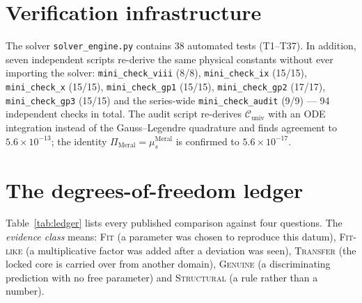 \documentclass[12pt,a4paper]{article}
\begin{document}
\section{Verification infrastructure}
The solver \texttt{solver\_engine.py} contains 38 automated tests
(T1--T37). In addition, seven independent scripts re-derive the same
physical constants without ever importing the solver:
\texttt{mini\_check\_viii} (8/8), \texttt{mini\_check\_ix} (15/15),
\texttt{mini\_check\_x} (15/15), \texttt{mini\_check\_gp1} (15/15),
\texttt{mini\_check\_gp2} (17/17), \texttt{mini\_check\_gp3} (15/15) and the
series-wide \texttt{mini\_check\_audit} (9/9) --- 94 independent checks in
total. The audit script re-derives $\mathcal{C}_{\mathrm{univ}}$ with an
ODE integration instead of the Gauss--Legendre quadrature and finds
agreement to $5.6\times10^{-13}$; the identity
$\Pi_{\mathrm{Meral}} = \mu_s^{\mathrm{Meral}}$ is confirmed to
$5.6\times10^{-17}$.

\section{The degrees-of-freedom ledger}
Table~\ref{tab:ledger} lists every published comparison against four
questions. The \emph{evidence class} means: \textsc{Fit} (a parameter was
chosen to reproduce this datum), \textsc{Fit-like} (a multiplicative factor
was added after a deviation was seen), \textsc{Transfer} (the locked core is
carried over from another domain), \textsc{Genuine} (a discriminating
prediction with no free parameter) and \textsc{Structural} (a rule rather
than a number).
\end{document}
